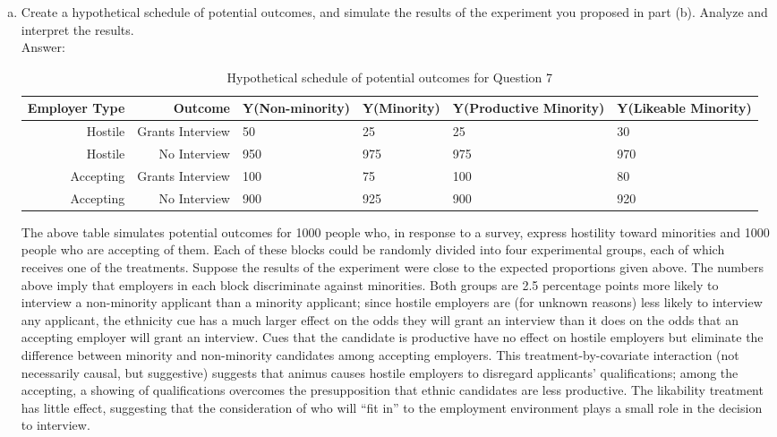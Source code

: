 \documentclass[11pt,notitlepage]{article}\usepackage[]{graphicx}\usepackage[]{color}
\begin{document}
\begin{enumerate}[a)]
\item Create a hypothetical schedule of potential outcomes, and simulate the results of the experiment you proposed in part (b). Analyze and interpret the results.\\
Answer:\\
\begin{table}[H]
  \centering
  \caption{Hypothetical schedule of potential outcomes for Question 7}
    \begin{tabular}{rrC{2.3cm}C{2.3cm}C{2.3cm}C{2.3cm}}
    \toprule
    Employer Type & Outcome      & Y(Non-minority) & Y(Minority) & Y(Productive Minority) & Y(Likeable Minority) \\
    \midrule
    Hostile & Grants Interview & 50    & 25    & 25    & 30 \\
    Hostile & No Interview & 950   & 975   & 975   & 970 \\
    Accepting & Grants Interview & 100   & 75    & 100   & 80 \\
    Accepting & No Interview & 900   & 925   & 900   & 920 \\
    \bottomrule
    \end{tabular}%
  \label{tab:addlabel}%
\end{table}%

The above table simulates potential outcomes for 1000 people who, in response to a survey, express hostility toward minorities and 1000 people who are accepting of them. Each of these blocks could be randomly divided into four experimental groups, each of which receives one of the treatments. Suppose the results of the experiment were close to the expected proportions given above. The numbers above imply that employers in each block discriminate against minorities. Both groups are 2.5 percentage points more likely to interview a non-minority applicant than a minority applicant; since hostile employers are (for unknown reasons) less likely to interview any applicant, the ethnicity cue has a much larger effect on the odds they will grant an interview than it does on the odds that an accepting employer will grant an interview. Cues that the candidate is productive have no effect on hostile employers but eliminate the difference between minority and non-minority candidates among accepting employers. This treatment-by-covariate interaction (not necessarily causal, but suggestive) suggests that animus causes hostile employers to disregard applicants' qualifications; among the accepting, a showing of qualifications overcomes the presupposition that ethnic candidates are less productive. The likability treatment has little effect, suggesting that the consideration of who will ``fit in'' to the employment environment plays a small role in the decision to interview.

\end{enumerate}
\end{document}
